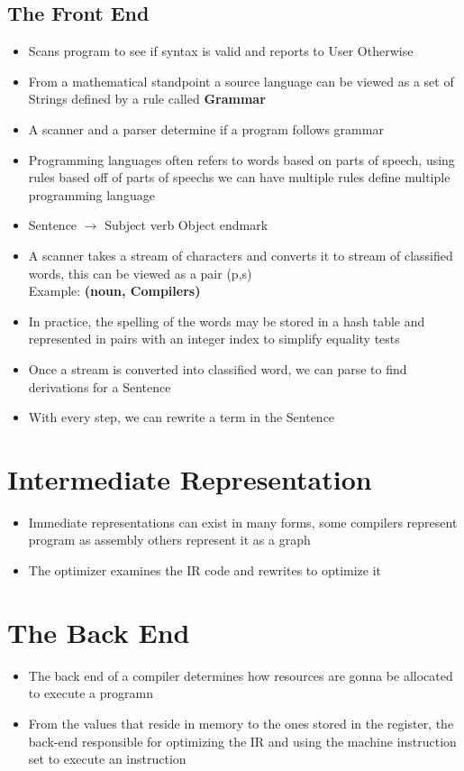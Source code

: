\documentclass[20pt]{article}
\begin{document}
	\subsection*{The Front End}
		\begin{itemize}
			\item Scans program to see if syntax is valid and reports to User Otherwise
			\item From a mathematical standpoint a source language can be viewed as a set of Strings defined by a rule called \textbf{Grammar}
  			\item A scanner and a parser determine if a program follows grammar
			\item Programming languages often refers to words based on parts of speech, using rules based off of parts of speechs we can have multiple rules define multiple programming language
   			\item Sentence $\rightarrow$ Subject verb Object endmark
      		\item A scanner takes a stream of characters and converts it to stream of classified words, this can be viewed as a pair (p,s)
			\\Example: \textbf{(noun, Compilers)}
			\item In practice, the spelling of the words may be stored in a hash table and represented in pairs with an integer index to simplify equality tests
   			\item Once a stream is converted into classified word, we can parse to find derivations for a Sentence
      		\item With every step, we can rewrite a term in the Sentence
		\end{itemize}
\section*{Intermediate Representation}
\begin{itemize} 
	\item Immediate representations can exist in many forms, some compilers represent program as assembly others represent it as a graph
 	\item The optimizer examines the IR code and rewrites to optimize it
\end{itemize}
\section*{The Back End}
\begin{itemize}
	\item The back end of a compiler determines how resources are gonna be allocated to execute a programn
	\item From the values that reside in memory to the ones stored in the register, the back-end responsible for optimizing the IR and using the machine instruction set to execute an instruction
\end{itemize}
\end{document}
